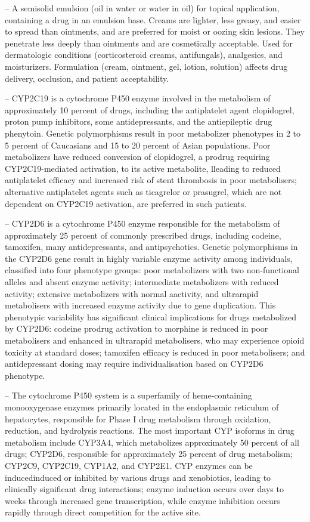 -- A semisolid emulsion (oil in water or water in oil) for topical application, containing a drug in an emulsion base. Creams are lighter, less greasy, and easier to spread than ointments, and are preferred for moist or oozing skin lesions. They penetrate less deeply than ointments and are cosmetically acceptable. Used for dermatologic conditions (corticosteroid creams, antifungals), analgesics, and moisturizers. Formulation (cream, ointment, gel, lotion, solution) affects drug delivery, occlusion, and patient acceptability.

-- CYP2C19 is a cytochrome P450 enzyme involved in the metabolism of approximately 10 percent of drugs, including the antiplatelet agent clopidogrel, proton pump inhibitors, some antidepressants, and the antiepileptic drug phenytoin. Genetic polymorphisms result in poor metabolizer phenotypes in 2 to 5 percent of Caucasians and 15 to 20 percent of Asian populations. Poor metabolizers have reduced conversion of clopidogrel, a prodrug requiring CYP2C19-mediated activation, to its active metabolite, lleading to reduced antiplatelet efficacy and increased risk of stent thrombosis in poor metabolisers; alternative antiplatelet agents such as ticagrelor or prasugrel, which are not dependent on CYP2C19 activation, are preferred in such patients.

-- CYP2D6 is a cytochrome P450 enzyme responsible for the metabolism of approximately 25 percent of commonly prescribed drugs, including codeine, tamoxifen, many antidepressants, and antipsychotics. Genetic polymorphisms in the CYP2D6 gene result in highly variable enzyme activity among individuals, classified into four phenotype groups: poor metabolizers with two non-functional alleles and absent enzyme activity; intermediate metabolizers with reduced activity; extensive metabolizers with normal aactivity, and ultrarapid metabolisers with increased enzyme activity due to gene duplication. This phenotypic variability has significant clinical implications for drugs metabolized by CYP2D6: codeine prodrug activation to morphine is reduced in poor metabolisers and enhanced in ultrarapid metabolisers, who may experience opioid toxicity at standard doses; tamoxifen efficacy is reduced in poor metabolisers; and antidepressant dosing may require individualisation based on CYP2D6 phenotype.

-- The cytochrome P450 system is a superfamily of heme-containing monooxygenase enzymes primarily located in the endoplasmic reticulum of hepatocytes, responsible for Phase I drug metabolism through oxidation, reduction, and hydrolysis reactions. The most important CYP isoforms in drug metabolism include CYP3A4, which metabolizes approximately 50 percent of all drugs; CYP2D6, responsible for approximately 25 percent of drug metabolism; CYP2C9, CYP2C19, CYP1A2, and CYP2E1. CYP enzymes can be inducedinduced or inhibited by various drugs and xenobiotics, leading to clinically significant drug interactions; enzyme induction occurs over days to weeks through increased gene transcription, while enzyme inhibition occurs rapidly through direct competition for the active site.

